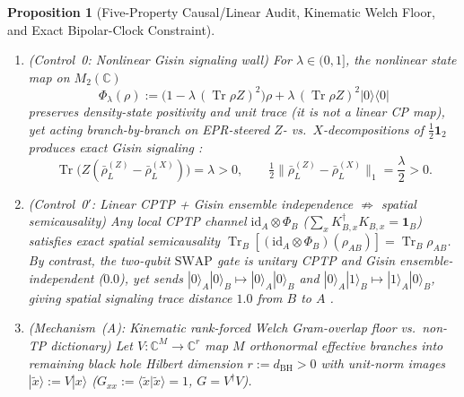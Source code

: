 \documentclass[11pt,a4paper]{article}
\newtheorem{proposition}{Proposition}
\theoremstyle{definition}
\theoremstyle{remark}
\newcommand{\Tr}{\operatorname{Tr}}
\newcommand{\id}{\mathrm{id}}
\newcommand{\bbC}{\mathbb{C}}
\newcommand{\1}{\mathbf{1}}
\newcommand{\normTr}[1]{\|#1\|_1}
\begin{document}
\begin{proposition}[Five-Property Causal/Linear Audit, Kinematic Welch Floor, and Exact Bipolar-Clock Constraint]\label{prop:branch-coupling}
\leavevmode
\begin{enumerate}
  \item[(0)] \emph{(Control~0: Nonlinear Gisin signaling wall)} For $\lambda\in(0,1]$, the nonlinear state map on $M_2(\bbC)$
  \begin{equation}\label{eq:gisin-map}
    \Phi_\lambda(\rho) := \bigl(1 - \lambda\,(\Tr\rho Z)^2\bigr)\rho + \lambda\,(\Tr\rho Z)^2 |0\rangle\langle 0|
  \end{equation}
  preserves density-state positivity and unit trace (it is \emph{not} a linear CP map), yet acting branch-by-branch on EPR-steered $Z$- vs.\ $X$-decompositions of $\frac{1}{2}\1_2$ produces exact Gisin signaling \cite{Gisin1990,Polchinski1991}:
  \begin{equation}\label{eq:gisin-bias}
    \Tr\bigl(Z(\bar{\rho}_L^{(Z)}-\bar{\rho}_L^{(X)})\bigr) = \lambda > 0,
    \qquad
    \tfrac{1}{2}\normTr{\bar{\rho}_L^{(Z)}-\bar{\rho}_L^{(X)}} = \frac{\lambda}{2} > 0.
  \end{equation}
  \item[(0$'$)] \emph{(Control~0$'$: Linear CPTP + Gisin ensemble independence $\not\Rightarrow$ spatial semicausality)} Any local CPTP channel $\id_A\otimes\Phi_B$ ($\sum_x K_{B,x}^\dagger K_{B,x}=\1_B$) satisfies exact spatial semicausality $\Tr_B[(\id_A\otimes\Phi_B)(\rho_{AB})]=\Tr_B\rho_{AB}$. By contrast, the two-qubit $\mathrm{SWAP}$ gate is unitary CPTP and Gisin ensemble-independent ($0.0$), yet sends $|0\rangle_A|0\rangle_B\mapsto |0\rangle_A|0\rangle_B$ and $|0\rangle_A|1\rangle_B\mapsto |1\rangle_A|0\rangle_B$, giving spatial signaling trace distance $1.0$ from $B$ to $A$ \cite{Beckman2001}.
  \item[(A)] \emph{(Mechanism~(A): Kinematic rank-forced Welch Gram-overlap floor vs.\ non-TP dictionary)} Let $V:\bbC^M\to\bbC^r$ map $M$ orthonormal effective branches into remaining black hole Hilbert dimension $r:=d_{\mathrm{BH}}>0$ with unit-norm images $|\tilde{x}\rangle:=V|x\rangle$ ($G_{xx}:=\langle\tilde{x}|\tilde{x}\rangle=1$, $G=V^\dagger V$).
  \begin{itemize}

\end{itemize}
\end{enumerate}
\end{proposition}
\end{document}
